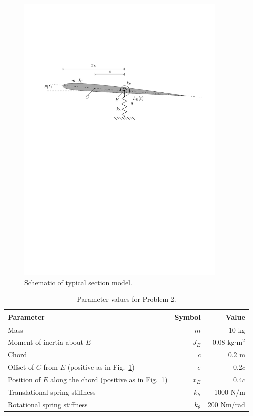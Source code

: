 \documentclass[11pt,a4paper]{article}
\begin{document}
\begin{figure}[htpt!]
	\centering
	\includegraphics[width=0.9\textwidth]{figures/typical_section.pdf}
	\caption{Schematic of typical section model.}
	\label{f2}
\end{figure}
%
\begin{table}[htpt!]
	\centering
	\caption{Parameter values for Problem 2. \label{t2}}
	\vspace{2mm}
	\label{tab:2}
	\begin{tabular}{lrr}
		\toprule
		Parameter & Symbol & Value \\
		\midrule 
		Mass & $m$ & 10 kg \\
		Moment of inertia about $E$ & $J_E$ & 0.08 kg$\cdot$m$^2$ \\
		Chord & $c$ & 0.2 m \\
		Offset of $C$ from $E$ (positive as in Fig.~\ref{f2}) & $e$ & $-0.2c$ \\
		Position of $E$ along the chord (positive as in Fig.~\ref{f2}) & $x_E$ & 0.4$c$ \\
		Translational spring stiffness & $k_h$ & 1000 N/m \\
		Rotational spring stiffness & $k_\theta$ & 200 Nm/rad \\ 
		\bottomrule
	\end{tabular}
\end{table}
\end{document}
